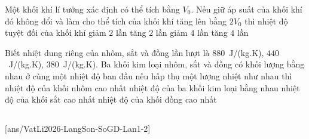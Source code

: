 	\begin{ex}%
		Một khối khí lí tưởng xác định có thể tích bằng $V_0$. Nếu giữ áp suất của khối khí đó không đổi và làm cho thể tích của khối khí tăng lên bằng $2V_0$ thì nhiệt độ tuyệt đối của khối khí
		\choice
		{giảm $2$ lần}
		{\True tăng $2$ lần}
		{giảm $4$ lần}
		{tăng $4$ lần}
	\end{ex}

	\begin{ex}%
		Biết nhiệt dung riêng của nhôm, sắt và đồng lần lượt là $880$~J/(kg.K), $440$~J/(kg.K), $380$~J/(kg.K). Ba khối kim loại nhôm, sắt và đồng có khối lượng bằng nhau ở cùng một nhiệt độ ban đầu nếu hấp thụ một lượng nhiệt như nhau thì
		\choice
		{nhiệt độ của khối nhôm cao nhất}
		{nhiệt độ của ba khối kim loại bằng nhau}
		{nhiệt độ của khối sắt cao nhất}
		{\True nhiệt độ của khối đồng cao nhất}
	\end{ex}

	\subsection*{}
	\setcounter{ex}{0}
	[ans/VatLi2026-LangSon-SoGD-Lan1-2]


